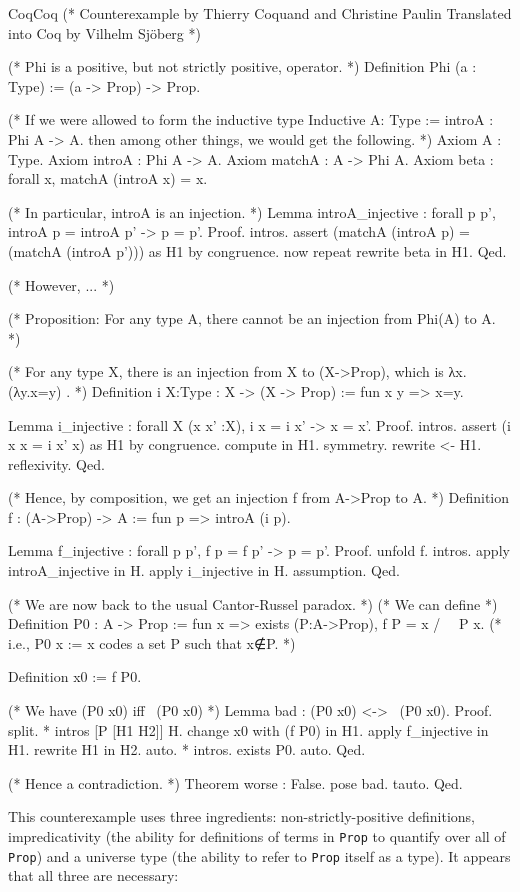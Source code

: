 \documentclass[11pt,oneside]{article}
\newcommand{\code}[1]{\texttt{#1}}
\newenvironment{codegroup}
  {\par\addvspace{\medskipamount}%
   \tcbset{cebox/.append style={before skip=7pt, after skip=7pt}}}
  {\par\addvspace{\medskipamount}}
\begin{document}
\begin{codegroup}
\begin{codebox}{Coq}{Coq}
(* Counterexample by Thierry Coquand and Christine Paulin
   Translated into Coq by Vilhelm Sjöberg *)

(* Phi is a positive, but not strictly positive, operator. *)
Definition Phi (a : Type) := (a -> Prop) -> Prop.

(* If we were allowed to form the inductive type
     Inductive A: Type :=
       introA : Phi A -> A.
   then among other things, we would get the following. *)
Axiom A : Type.
Axiom introA : Phi A -> A.
Axiom matchA : A -> Phi A.
Axiom beta : forall x, matchA (introA x) = x.

(* In particular, introA is an injection. *)
Lemma introA_injective : forall p p', introA p = introA p' -> p = p'.
Proof.
  intros.
  assert (matchA (introA p) = (matchA (introA p'))) as H1 by congruence.
  now repeat rewrite beta in H1.
Qed.

(* However, ... *) 

(* Proposition: For any type A, there cannot be an injection
   from Phi(A) to A. *)

(* For any type X, there is an injection from X to (X->Prop),
   which is λx.(λy.x=y) . *)
Definition i {X:Type} : X -> (X -> Prop) := 
  fun x y => x=y.

Lemma i_injective : forall X (x x' :X), i x = i x' -> x = x'.
Proof.
  intros.
  assert (i x x = i x' x) as H1 by congruence.
  compute in H1.
  symmetry.
  rewrite <- H1.
  reflexivity.
Qed.  

(* Hence, by composition, we get an injection f from A->Prop to A. *)
Definition f : (A->Prop) -> A 
  := fun p => introA (i p).

Lemma f_injective : forall p p', f p = f p' -> p = p'.
Proof.
  unfold f. intros.
  apply introA_injective in H. apply i_injective in H. assumption.
Qed.

(* We are now back to the usual Cantor-Russel paradox. *)
(* We can define *)
Definition P0 : A -> Prop
  := fun x => 
       exists (P:A->Prop), f P = x /\ ~ P x.
  (* i.e., P0 x := x codes a set P such that x∉P. *)

Definition x0 := f P0.

(* We have (P0 x0) iff ~(P0 x0) *)
Lemma bad : (P0 x0) <-> ~(P0 x0).
Proof.
split.
  * intros [P [H1 H2]] H.
    change x0 with (f P0) in H1.
    apply f_injective in H1. rewrite H1 in H2.
    auto.
  * intros.
    exists P0. auto.
Qed.

(* Hence a contradiction. *)
Theorem worse : False.
  pose bad. tauto.
Qed.
\end{codebox}
\end{codegroup}
This counterexample uses three ingredients: non-strictly-positive definitions, impredicativity (the ability for definitions of terms in \code{Prop} to quantify over all of \code{Prop}) and a universe type (the ability to refer to \code{Prop} itself as a type). It appears that all three are necessary:
\end{document}
